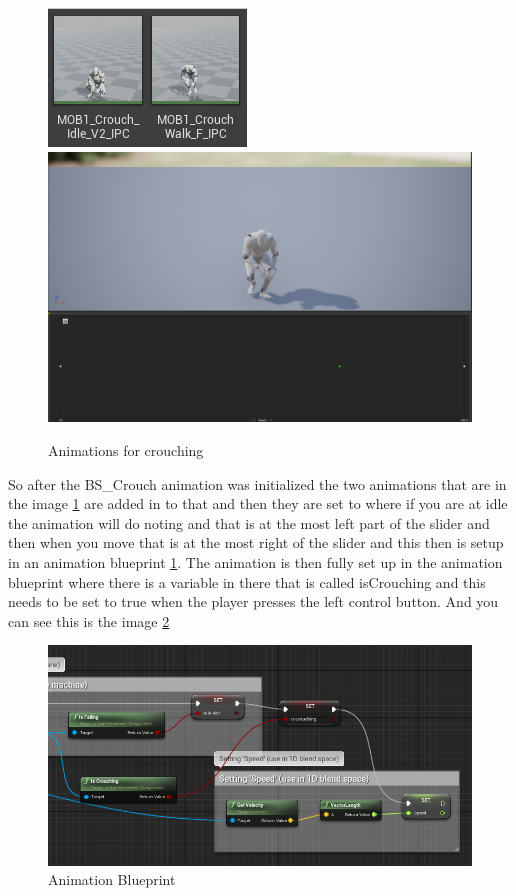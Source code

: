\begin{figure}[H]
    \centering
    \includegraphics[scale=.8]{img/Crouch.PNG}
    \includegraphics[scale=.15]{img/Crouch_BS.PNG}
    \caption{Animations for crouching}
    \label{Crouch}
\end{figure}
So after the BS\_Crouch animation was initialized the two animations that are in the image \ref{Crouch} are added in to that and then they are set to where if you are at idle the animation will do noting and that is at the most left part of the slider and then when you move that is at the most right of the slider and this then is setup in an animation blueprint \ref{Crouch}. The animation is then fully set up in the animation blueprint where there is a variable in there that is called isCrouching and this needs to be set to true when the player presses the left control button. And you can see this is the image \ref{Crouch_BP}
\begin{figure}[H]
    \centering
    \includegraphics[scale=.6]{img/Crouch_BP.PNG}
    \caption{Animation Blueprint}
    \label{Crouch_BP}
\end{figure}
